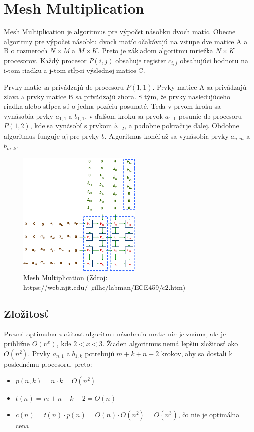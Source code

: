 \documentclass[a4paper,11pt]{article}
\begin{document}
\section{Mesh Multiplication}
Mesh Multiplication je algoritmus pre výpočet násobku dvoch matíc. Obecne algoritmy pre výpočet násobku dvoch matíc očakávajú na vstupe dve matice A a B o rozmeroch $N \times M $ a $ M \times K $. Preto je základom algoritmu mriežka $N \times K $ procesorov. Každý procesor $ P(i, j) $ obsahuje register $ c_{i,j} $ obsahujúci hodnotu na i-tom riadku a j-tom stĺpci výslednej matice C.

Prvky matíc sa privádzajú do procesoru $ P(1,1)$. Prvky matice A sa privádzajú zľava a prvky matice B sa privádzajú zhora. S tým, že prvky nasledujúceho riadka alebo stĺpca sú o jednu pozíciu posunuté. Teda v prvom kroku sa vynásobia prvky $ a_{1,1} $ a $ b_{1,1} $, v ďalšom kroku sa prvok $ a_{1,1} $ posunie do procesoru $ P(1,2)$, kde sa vynásobí s prvkom $ b_{1,2} $, a podobne pokračuje ďalej. Obdobne algoritmus funguje aj pre prvky $b$. Algoritmus končí až sa vynásobia prvky $ a_{n,m} $ a $ b_{m,k} $.

\begin{figure}[!htb]
\centering
\includegraphics[width=60mm, scale=0.5]{mm.png}
\caption{Mesh Multiplication \fontsize{8pt}{12pt}\selectfont(Zdroj: https://web.njit.edu/~gilhc/labman/ECE459/e2.htm)}
\end{figure}

\subsection{Zložitosť}
Presná optimálna zložitosť algoritmu násobenia matíc nie je známa, ale je približne $O(n^x)$, kde $2<x<3$. Žiaden algoritmus nemá lepšiu zložitosť ako $O(n^2)$.
Prvky $ a_{n,1} $ a $ b_{1,k} $ potrebujú $m+k+n-2$ krokov, aby sa dostali k poslednému procesoru, preto:
\begin{itemize}
\item $ p(n,k) = n \cdot k = O(n^2)$
\item $ t(n) = m+n+k-2 = O(n) $
\item $ c(n) = t(n) \cdot p(n) = O(n)\cdot O(n^2) = O(n^3) $, čo nie je optimálna cena
\end{itemize}
\end{document}
